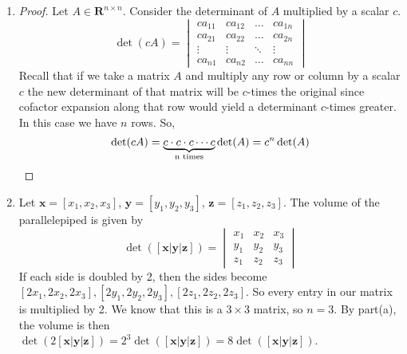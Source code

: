 \documentclass{article}
\theoremstyle{definition}
\begin{document}
	\begin{prob}{3.13} $  $
		\begin{enumerate}[label=\alph*.)]
			\item 
				\begin{proof}
					Let $ A \in \mathbf{R}^{n\times n} $. Consider the determinant of $ A $ multiplied by a scalar $ c $.
					\[
						\det(cA) = \begin{vmatrix} ca_{11} & ca_{12} & \dots & ca_{1n} \\ ca_{21} & ca_{22} & \dots & ca_{2n} \\
						\vdots & \vdots & \ddots & \vdots \\ ca_{n1} & ca_{n2} & \dots & ca_{nn}  \end{vmatrix}
					\]
					Recall that if we take a matrix $ A $ and multiply any row or column by a scalar $ c $ the new determinant of that matrix will be $ c $-times the original since cofactor expansion along that row would yield a determinant $ c $-times greater. In this case we have $ n $ rows. So,
					\[
						\det(cA) = 
						\underbrace{c \cdot c \cdot c \cdots c}_\text{n \text{times}} \det(A) = c^n \det(A)
					\]
				\end{proof}
			\item Let $ \mathbf{x} = [x_1, x_2, x_3] $, $ \mathbf{y} = [y_1, y_2, y_3] $, $ \mathbf{z} = [z_1, z_2, z_3] $. The volume of the parallelepiped is given by
			\[
				\det([\mathbf{x} | \mathbf{y} | \mathbf{z}]) = \begin{vmatrix} x_1 & x_2 & x_3 \\ y_1 & y_2 & y_3 \\ z_1 & z_2 & z_3 \end{vmatrix}
			\]
			If each side is doubled by 2, then the sides become $ [2x_1, 2x_2, 2x_3], [2y_1, 2y_2, 2y_3], [2z_1, 2z_2, 2z_3] $. So every entry in our matrix is multiplied by 2. We know that this is a $ 3\times 3 $ matrix, so $ n=3 $. By part(a), the volume is then $ \det(2[\mathbf{x} | \mathbf{y} | \mathbf{z}]) = 2^3 \det([\mathbf{x} | \mathbf{y} | \mathbf{z}]) = 8\det([\mathbf{x} | \mathbf{y} | \mathbf{z}]) $.
		\end{enumerate}
	\end{prob}
    
\end{document}
